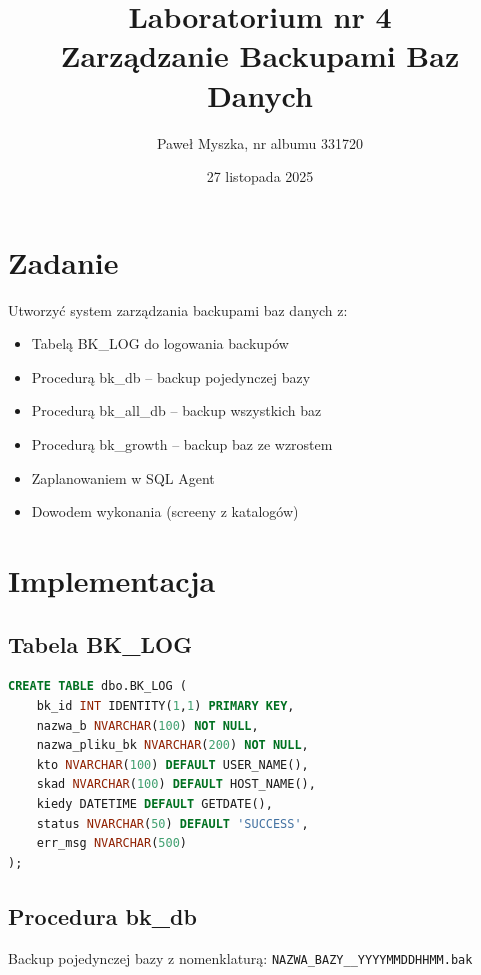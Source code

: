 \documentclass[a4paper,11pt]{article}
\title{Laboratorium nr 4\\
	\large Zarządzanie Backupami Baz Danych}
\author{Paweł Myszka, nr albumu 331720}
\date{27 listopada 2025}
\begin{document}
	
	\maketitle
	
	\section{Zadanie}
	
	Utworzyć system zarządzania backupami baz danych z:
	\begin{itemize}
		\item Tabelą BK\_LOG do logowania backupów
		\item Procedurą bk\_db -- backup pojedynczej bazy
		\item Procedurą bk\_all\_db -- backup wszystkich baz
		\item Procedurą bk\_growth -- backup baz ze wzrostem
		\item Zaplanowaniem w SQL Agent
		\item Dowodem wykonania (screeny z katalogów)
	\end{itemize}
	
	\section{Implementacja}
	
	\subsection{Tabela BK\_LOG}
	
	\begin{lstlisting}[language=SQL]
CREATE TABLE dbo.BK_LOG (
	bk_id INT IDENTITY(1,1) PRIMARY KEY,
	nazwa_b NVARCHAR(100) NOT NULL,
	nazwa_pliku_bk NVARCHAR(200) NOT NULL,
	kto NVARCHAR(100) DEFAULT USER_NAME(),
	skad NVARCHAR(100) DEFAULT HOST_NAME(),
	kiedy DATETIME DEFAULT GETDATE(),
	status NVARCHAR(50) DEFAULT 'SUCCESS',
	err_msg NVARCHAR(500)
);
	\end{lstlisting}
	
	\subsection{Procedura bk\_db}
	
	Backup pojedynczej bazy z nomenklaturą: \texttt{NAZWA\_BAZY\_\_YYYYMMDDHHMM.bak}
	
\end{document}
